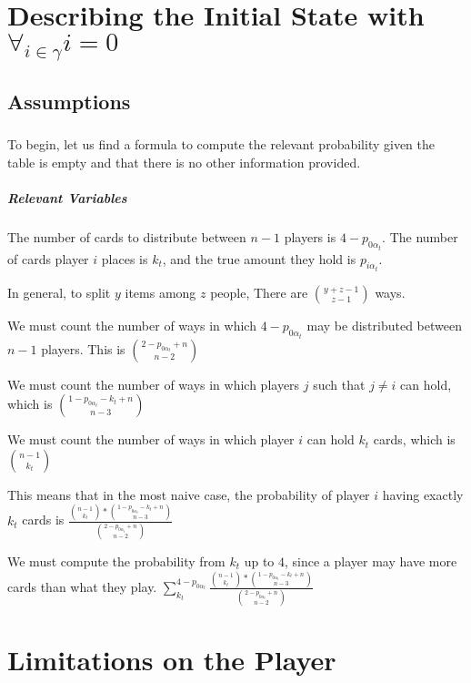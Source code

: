 \documentclass[letterpaper,11pt]{report}
\begin{document}
\chapter{Describing the Initial State with $\forall_{i\in\gamma} i = 0$}
\section{Assumptions} 
\paragraph*{} To begin, let us find a formula to compute the relevant probability given the table is empty and that there is no other information provided.
\paragraph*{Relevant Variables} The number of cards to distribute between $n-1$ players is $4-p_{0 \alpha_{t}}$. The number of cards player $i$ places is $k_t$, and the true amount they hold is $p_{i \alpha_t}$.
\begin{description}
    \item In general, to split $y$ items among $z$ people, There are ${y+z-1 \choose z-1}$ ways.
    \item We must count the number of ways in which $4-p_{0 \alpha_{t}}$ may be distributed between $n-1$ players. This is ${2-p_{0 \alpha_{t}} + n \choose n-2}$
    \item We must count the number of ways in which players $j$ such that $j\neq i$ can hold, which is ${1-p_{0 \alpha_{t}} - k_t + n \choose n-3}$ 
    \item We must count the number of ways in which player $i$ can hold $k_t$ cards, which is ${n-1 \choose k_t}$
    \linebreak
    \item This means that in the most naive case, the probability of player $i$ having exactly $k_t$ cards is  $\frac{{n-1 \choose k_t}\ast{1-p_{0 \alpha_{t}} - k_t + n \choose n-3}}{{2-p_{0 \alpha_{t}} + n \choose n-2}}$
    \item We must compute the probability from $k_t$ up to $4$, since a player may have more cards than what they play. $\sum\limits_{k_t}^{4-p_{0 \alpha_{t}}} \frac{{n-1 \choose k_t}\ast{1-p_{0 \alpha_{t}} - k_t + n \choose n-3}}{{2-p_{0 \alpha_{t}} + n \choose n-2}}$ 
\end{description}
\chapter{Limitations on the Player}
\end{document}
